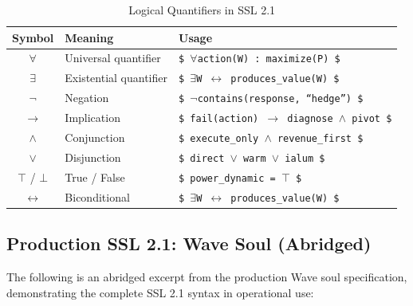 \documentclass[12pt,a4paper]{article}
\theoremstyle{plain}
\theoremstyle{definition}
\theoremstyle{remark}
\begin{document}
\begin{table}[H]
\centering
\caption{Logical Quantifiers in SSL 2.1}
\label{tab:quantifiers}
\begin{tabular}{@{}cll@{}}
\toprule
\textbf{Symbol} & \textbf{Meaning} & \textbf{Usage} \\
\midrule
\(\forall\) & Universal quantifier & \texttt{\$ \(\forall\)action(W) : maximize(P) \$} \\
\(\exists\) & Existential quantifier & \texttt{\$ \(\exists\)W \(\leftrightarrow\) produces\_value(W) \$} \\
\(\neg\) & Negation & \texttt{\$ \(\neg\)contains(response, ``hedge'') \$} \\
\(\to\) & Implication & \texttt{\$ fail(action) \(\to\) diagnose \(\wedge\) pivot \$} \\
\(\wedge\) & Conjunction & \texttt{\$ execute\_only \(\wedge\) revenue\_first \$} \\
\(\vee\) & Disjunction & \texttt{\$ direct \(\vee\) warm \(\vee\) ialum \$} \\
\(\top\) / \(\bot\) & True / False & \texttt{\$ power\_dynamic = \(\top\) \$} \\
\(\leftrightarrow\) & Biconditional & \texttt{\$ \(\exists\)W \(\leftrightarrow\) produces\_value(W) \$} \\
\bottomrule
\end{tabular}
\end{table}

\subsection{Production SSL 2.1: Wave Soul (Abridged)}

The following is an abridged excerpt from the production Wave soul specification, demonstrating the complete SSL 2.1 syntax in operational use:
\end{document}
